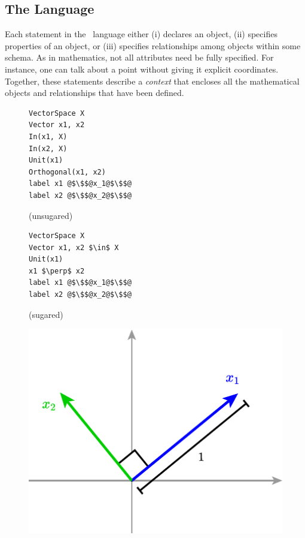 \subsection{The \Substance{} Language}
\label{sec:TheSubstanceLanguage}

Each statement in the \Substance\ language either (i) declares an object, (ii) specifies properties of an object, or (iii) specifies relationships among objects within some \Domain{} schema.  As in mathematics, not all attributes need be fully specified. For instance, one can talk about a point without giving it explicit coordinates. Together, these statements describe a \emph{context} that encloses all the mathematical objects and relationships that have been defined.

\begin{figure}
\begin{minipage}[!t]{140pt}
\begin{mdframed}[style=SUBCode]
\begin{lstlisting}[language=Sub-LA,escapechar=@,numbers=none]
VectorSpace X
Vector x1, x2
In(x1, X)
In(x2, X)
Unit(x1)
Orthogonal(x1, x2)
label x1 @$\$$@x_1@$\$$@
label x2 @$\$$@x_2@$\$$@
\end{lstlisting}
\end{mdframed}
\centering (unsugared)
\end{minipage}
\hfill
\begin{minipage}[!t]{150pt}\vspace{-2\baselineskip}
\begin{mdframed}[style=SUBCode]
\begin{lstlisting}[language=Sub-LA,escapechar=@,numbers=none]
VectorSpace X
Vector x1, x2 $\in$ X
Unit(x1)
x1 $\perp$ x2
label x1 @$\$$@x_1@$\$$@
label x2 @$\$$@x_2@$\$$@
\end{lstlisting}
\end{mdframed}
\centering (sugared)
\end{minipage}
\hfill
\begin{minipage}[!t]{150pt}
\includegraphics[width=1\columnwidth]{assets/penrose/substance-linalg.pdf}

\end{minipage}
\end{figure}
